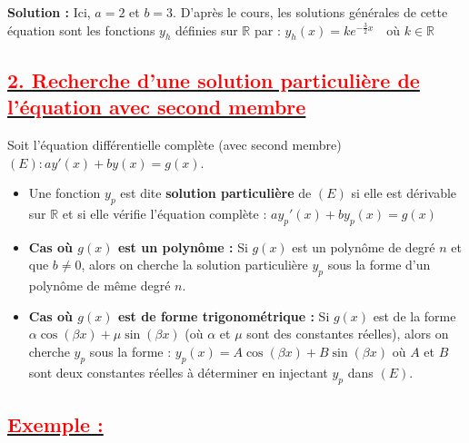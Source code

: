 \documentclass[12pt,a4paper]{article}
\begin{document}
\textbf{Solution :} 
Ici, $a = 2$ et $b = 3$. D'après le cours, les solutions générales de cette équation sont les fonctions $y_h$ définies sur $\mathbb{R}$ par :
$ y_h(x) = k e^{-\frac{3}{2}x} \quad \text{où } k \in \mathbb{R} $
\subsection*{\underline{\textbf{\textcolor{red}{2. Recherche d'une solution particulière de l'équation avec second membre}}}}

Soit l'équation différentielle complète (avec second membre) $(E) : ay'(x) + by(x) = g(x)$.

\begin{itemize}
    \item Une fonction $y_p$ est dite \textbf{solution particulière} de $(E)$ si elle est dérivable sur $\mathbb{R}$ et si elle vérifie l'équation complète : 
    $ a y_p'(x) + b y_p(x) = g(x) $
    
    \item \textbf{Cas où $g(x)$ est un polynôme :} Si $g(x)$ est un polynôme de degré $n$ et que $b \neq 0$, alors on cherche la solution particulière $y_p$ sous la forme d'un polynôme de même degré $n$.
    
    \item \textbf{Cas où $g(x)$ est de forme trigonométrique :} Si $g(x)$ est de la forme $\alpha \cos(\beta x) + \mu \sin(\beta x)$ (où $\alpha$ et $\mu$ sont des constantes réelles), alors on cherche $y_p$ sous la forme :
    $ y_p(x) = A \cos(\beta x) + B \sin(\beta x) $
    où $A$ et $B$ sont deux constantes réelles à déterminer en injectant $y_p$ dans $(E)$.
\end{itemize}

\subsection*{\underline{\textbf{\textcolor{red}{Exemple :}}}}
\end{document}
